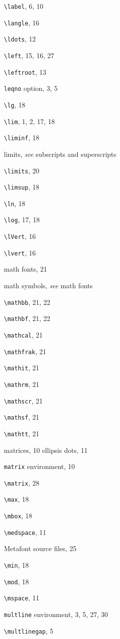\documentclass[leqno,titlepage,openany]{amsldoc}[1999/12/13]
\providecommand{\see}[2]{\textit{see} #1}
\begin{document}
\begin{theindex}
  \item \verb*+\label+, 6, 10
  \item \verb*+\langle+, 16
  \item \verb*+\ldots+, 12
  \item \verb*+\left+, 15, 16, 27
  \item \verb*+\leftroot+, 13
  \item \texttt{leqno} option, 3, 5
  \item \verb*+\lg+, 18
  \item \verb*+\lim+, 1, 2, 17, 18
  \item \verb*+\liminf+, 18
  \item limits, \see{subscripts and superscripts}{2}
  \item \verb*+\limits+, 20
  \item \verb*+\limsup+, 18
  \item \verb*+\ln+, 18
  \item \verb*+\log+, 17, 18
  \item \verb*+\lVert+, 16
  \item \verb*+\lvert+, 16

  \indexspace

  \item math fonts, 21
  \item math symbols, \see{math fonts}{21}
  \item \verb*+\mathbb+, 21, 22
  \item \verb*+\mathbf+, 21, 22
  \item \verb*+\mathcal+, 21
  \item \verb*+\mathfrak+, 21
  \item \verb*+\mathit+, 21
  \item \verb*+\mathrm+, 21
  \item \verb*+\mathscr+, 21
  \item \verb*+\mathsf+, 21
  \item \verb*+\mathtt+, 21
  \item matrices, 10
    \subitem ellipsis dots, 11
  \item \texttt{matrix} environment, 10
  \item \verb*+\matrix+, 28
  \item \verb*+\max+, 18
  \item \verb*+\mbox+, 18
  \item \verb*+\medspace+, 11
  \item Metafont source files, 25
  \item \verb*+\min+, 18
  \item \verb*+\mod+, 18
  \item \verb*+\mspace+, 11
  \item \texttt{multline} environment, 3, 5, 27, 30
  \item \verb*+\multlinegap+, 5


\end{theindex}
\end{document}

